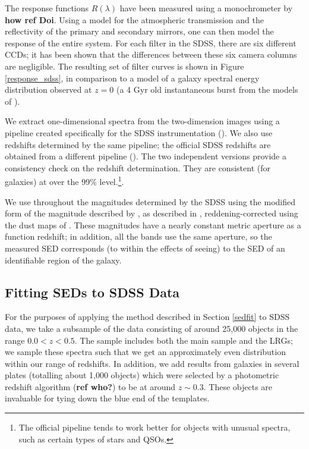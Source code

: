 \documentclass[10pt,preprint]{aastex}
\begin{document}
The response functions $R(\lambda)$ have been measured using a
monochrometer by {\bf how ref Doi}.  Using a model for the atmospheric
transmission and the reflectivity of the primary and secondary
mirrors, one can then model the response of the entire system. For
each filter in the SDSS, there are six different CCDs; it has been
shown that the differences between these six camera columns are
negligible. The resulting set of filter curves is shown in Figure
\ref{response_sdss}, in comparison to a model of a galaxy spectral
energy distribution observed at $z=0$ (a 4 Gyr old instantaneous burst
from the models of \citealt{bruzual93a}).

We extract one-dimensional spectra from the two-dimension images using
a pipeline created specifically for the SDSS instrumentation
(\citealt{schlegel02a}). We also use redshifts determined by the same
pipeline; the official SDSS redshifts are obtained from a different
pipeline (\citealt{subbarao02a}). The two independent versions provide
a consistency check on the redshift determination. They are consistent
(for galaxies) at over the 99\% level.\footnote{The official pipeline
tends to work better for objects with unusual spectra, such as certain
types of stars and QSOs.}.

We use throughout the magnitudes determined by the SDSS using the
modified form of the magnitude described by \citet{petrosian76a}, as
described in \citet{strauss02a}, reddening-corrected using the dust
maps of \citet{schlegel98a}. These magnitudes have a nearly constant
metric aperture as a function redshift; in addition, all the bands use
the same aperture, so the measured SED corresponds (to within the
effects of seeing) to the SED of an identifiable region of the galaxy.

\subsection{Fitting SEDs to SDSS Data}

For the purposes of applying the method described in Section
\ref{sedfit} to SDSS data, we take a subsample of the data consisting
of around 25,000 objects in the range $0.0<z<0.5$. The sample includes
both the main sample and the LRGs; we sample these spectra such that
we get an approximately even distribution within our range of
redshifts. In addition, we add results from galaxies in several plates
(totalling about 1,000 objects) which were selected by a photometric
redshift algorithm ({\bf ref who?}) to be at around $z\sim 0.3$. These
objects are invaluable for tying down the blue end of the templates.
\end{document}
